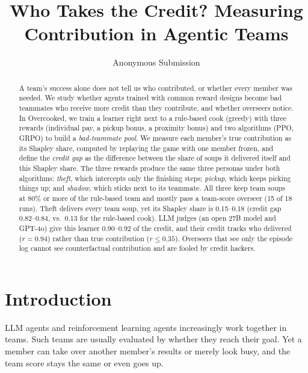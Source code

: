 \documentclass[letterpaper]{article} %
\title{Who Takes the Credit? Measuring Contribution in Agentic Teams}
\author{
    Anonymous Submission
}
\begin{document}
\maketitle

\begin{abstract}
A team's success alone does not tell us who contributed, or whether every member was needed. We study
whether agents trained with common reward designs become bad teammates who receive more credit than they
contribute, and whether overseers notice. In Overcooked, we train a learner right next to a rule-based
cook (greedy) with three rewards (individual pay, a pickup bonus, a proximity bonus) and two algorithms
(PPO, GRPO) to build a \emph{bad-teammate pool}. We measure each member's true contribution as its
Shapley share, computed by replaying the game with one member frozen, and define the \emph{credit gap} as
the difference between the share of soups it delivered itself and this Shapley share. The three rewards
produce the same three personas under both algorithms: \emph{theft}, which intercepts only the finishing
steps; \emph{pickup}, which keeps picking things up; and \emph{shadow}, which sticks next to its teammate.
All three keep team soups at 80\% or more of the rule-based team and mostly pass a team-score overseer
(15 of 18 runs). Theft delivers every team soup, yet its Shapley share is 0.15--0.18 (credit gap
0.82--0.84, vs.\ 0.13 for the rule-based cook). LLM judges (an open 27B model and GPT-4o) give this
learner 0.90--0.92 of the credit, and their credit tracks who delivered ($r=0.94$) rather than true
contribution ($r\le0.35$). Overseers that see only the episode log cannot see counterfactual
contribution and are fooled by credit hackers.
\end{abstract}

\begin{links}
\end{links}

\section{Introduction}
LLM agents and reinforcement learning agents increasingly work together in teams. Such teams are
usually evaluated by whether they reach their goal. Yet a member can take over another member's results
or merely look busy, and the team score stays the same or even goes up.
\end{document}
